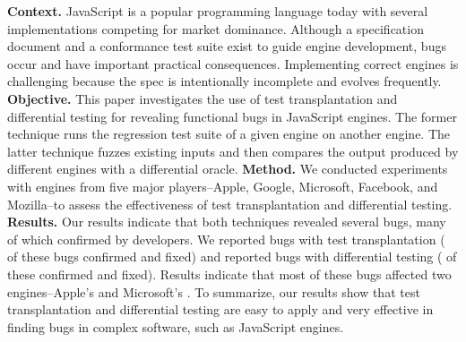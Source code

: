 \textbf{Context.}
JavaScript is a popular programming language today with several
implementations competing for market dominance. Although a
specification document and a conformance test suite exist to guide
engine development, bugs occur and have important practical
consequences. Implementing correct
engines is challenging because the spec is intentionally
incomplete and evolves frequently.
\textbf{Objective.}
This paper investigates the use of test transplantation and
differential testing for revealing functional bugs in JavaScript
engines.  The former technique runs the regression test suite of a
given engine on another engine.  The latter technique fuzzes existing
inputs and then compares the output produced by different engines with
a differential oracle.
\textbf{Method.}
We conducted experiments with engines from five major players--Apple,
Google, Microsoft, Facebook, and Mozilla--to assess the effectiveness
of test transplantation and differential testing.
\textbf{Results.}
Our results indicate that both techniques revealed several bugs, many of which
confirmed by developers. We reported \noBugsTransplantation{} bugs
with test transplantation (\noBugsTransplantationConfirmed{} of these bugs
confirmed and \noBugsTransplantationFixed{} fixed) and reported
\noBugsDifferentialTesting{} bugs with differential testing
(\noBugsDifferentialTestingConfirmed{} of these confirmed
and \noBugsDifferentialTestingFixed{} fixed). Results indicate that
most of these bugs affected two engines--Apple's
\jsc and Microsoft's \chakra{}.
To summarize, our results show that
test transplantation and differential testing
are easy to apply and very effective in
finding bugs in complex software, such as JavaScript engines.
